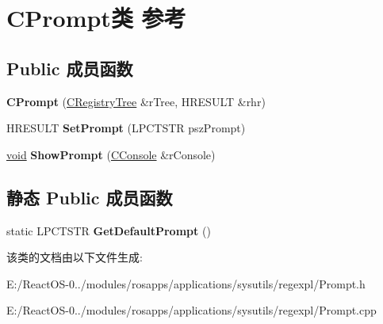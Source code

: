 \hypertarget{class_c_prompt}{}\section{C\+Prompt类 参考}
\label{class_c_prompt}
\subsection*{Public 成员函数}
\begin{DoxyCompactItemize}
\item 
\mbox{\label{class_c_prompt_a733453c801bd7e3c522c9c4ebe5c3a98}} 
{\bfseries C\+Prompt} (\hyperlink{class_c_registry_tree}{C\+Registry\+Tree} \&r\+Tree, H\+R\+E\+S\+U\+LT \&rhr)
\item 
\mbox{\label{class_c_prompt_a2c680e2c56f57d7a1c202c6c63bdeca2}} 
H\+R\+E\+S\+U\+LT {\bfseries Set\+Prompt} (L\+P\+C\+T\+S\+TR psz\+Prompt)
\item 
\mbox{\label{class_c_prompt_a020ebb733a2f419dda01b7e6cdaad748}} 
\hyperlink{interfacevoid}{void} {\bfseries Show\+Prompt} (\hyperlink{class_c_console}{C\+Console} \&r\+Console)
\end{DoxyCompactItemize}
\subsection*{静态 Public 成员函数}
\begin{DoxyCompactItemize}
\item 
\mbox{\label{class_c_prompt_a13390baa8d8d124a6f56682d558f36dc}} 
static L\+P\+C\+T\+S\+TR {\bfseries Get\+Default\+Prompt} ()
\end{DoxyCompactItemize}


该类的文档由以下文件生成\+:\begin{DoxyCompactItemize}
\item 
E\+:/\+React\+O\+S-\/0../modules/rosapps/applications/sysutils/regexpl/Prompt.\+h\item 
E\+:/\+React\+O\+S-\/0../modules/rosapps/applications/sysutils/regexpl/Prompt.\+cpp\end{DoxyCompactItemize}
